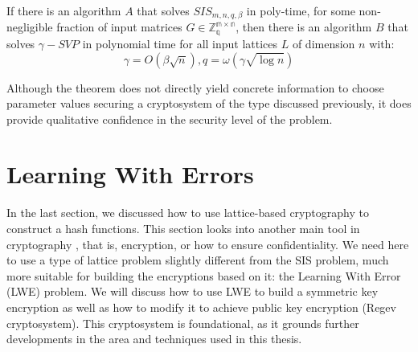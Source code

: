 \begin{theorem}
   If there is an algorithm $A$ that solves
  $SIS_{m,n,q,\beta}$ in poly-time, for some non-negligible fraction of input
  matrices $G \in \mathbb{Z_q^{m \times n}}$, then there is an algorithm $B$
  that solves $\gamma-SVP$ in polynomial time for all input lattices $L$ of
  dimension $n$ with:
  \[
    \gamma = O(\beta\sqrt{n}), q = \omega(\gamma\sqrt{\log n})
  \]
  \label{theo:AjtaiHardness}
\end{theorem}

Although the theorem does not directly yield concrete information to choose
parameter values securing a cryptosystem of the type discussed previously, it does provide qualitative confidence in the security level of the problem.

\section{Learning With Errors}
\label{sub:LWE}
In the last section, we discussed how to use lattice-based cryptography to
construct a hash functions. This section looks into another main tool in
cryptography , that is, encryption, or how to ensure confidentiality. We need here to
use a type of lattice problem slightly different from the SIS problem, much more suitable for building the encryptions based on it: the Learning With Error (LWE) problem. We will discuss how to use LWE to build a symmetric key encryption as well as how to modify it to achieve public key encryption (Regev cryptosystem). This cryptosystem is foundational, as it grounds further developments in the area and techniques used in this thesis.

